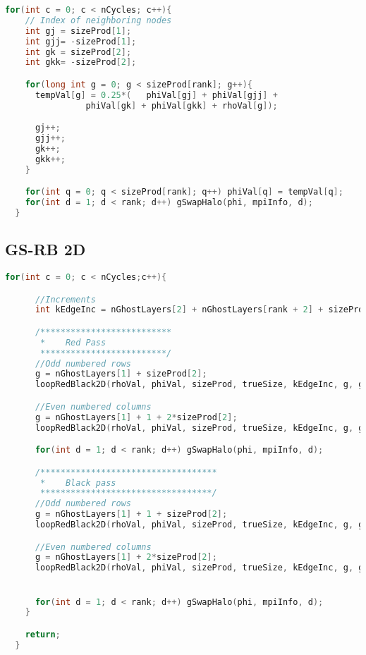 \begin{lstlisting}[language=c, caption = Code snippet 2D jacobian]
  for(int c = 0; c < nCycles; c++){
    // Index of neighboring nodes
    int gj = sizeProd[1];
    int gjj= -sizeProd[1];
    int gk = sizeProd[2];
    int gkk= -sizeProd[2];

    for(long int g = 0; g < sizeProd[rank]; g++){
      tempVal[g] = 0.25*(	phiVal[gj] + phiVal[gjj] +
                phiVal[gk] + phiVal[gkk] + rhoVal[g]);

      gj++;
      gjj++;
      gk++;
      gkk++;
    }

    for(int q = 0; q < sizeProd[rank]; q++) phiVal[q] = tempVal[q];
    for(int d = 1; d < rank; d++) gSwapHalo(phi, mpiInfo, d);
  }
\end{lstlisting}

\newpage
\subsection{GS-RB 2D}
\label{sec:GS_RB_2D}
\begin{lstlisting}[language=c, caption = Main loop]
    for(int c = 0; c < nCycles;c++){

      //Increments
      int kEdgeInc = nGhostLayers[2] + nGhostLayers[rank + 2] + sizeProd[2];

      /**************************
       *	Red Pass
       *************************/
      //Odd numbered rows
      g = nGhostLayers[1] + sizeProd[2];
      loopRedBlack2D(rhoVal, phiVal, sizeProd, trueSize, kEdgeInc, g, gj, gjj, gk, gkk);

      //Even numbered columns
      g = nGhostLayers[1] + 1 + 2*sizeProd[2];
      loopRedBlack2D(rhoVal, phiVal, sizeProd, trueSize, kEdgeInc, g, gj, gjj, gk, gkk);

      for(int d = 1; d < rank; d++) gSwapHalo(phi, mpiInfo, d);

      /***********************************
       *	Black pass
       **********************************/
      //Odd numbered rows
      g = nGhostLayers[1] + 1 + sizeProd[2];
      loopRedBlack2D(rhoVal, phiVal, sizeProd, trueSize, kEdgeInc, g, gj, gjj, gk, gkk);

      //Even numbered columns
      g = nGhostLayers[1] + 2*sizeProd[2];
      loopRedBlack2D(rhoVal, phiVal, sizeProd, trueSize, kEdgeInc, g, gj, gjj, gk, gkk);


      for(int d = 1; d < rank; d++) gSwapHalo(phi, mpiInfo, d);
    }

    return;
  }
\end{lstlisting}

